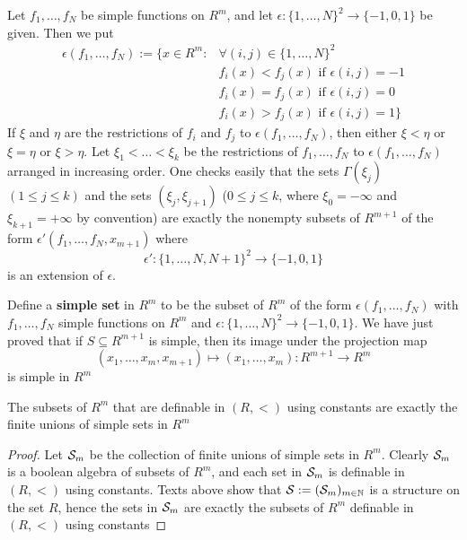 \documentclass[11pt]{article}
\begin{document}
Let \(f_1,\dots,f_N\) be simple functions on \(R^m\), and let \(\epsilon:\{1,\dots,N\}^2\to\{-1,0,1\}\) be given. Then
we put
\begin{align*}
\epsilon(f_1,\dots,f_N):=\{x\in R^m:&\forall(i,j)\in\{1,\dots,N\}^2\\
&f_i(x)<f_j(x)\text{ if }\epsilon(i,j)=-1\\
&f_i(x)=f_j(x)\text{ if }\epsilon(i,j)=0\\
&f_i(x)>f_j(x)\text{ if }\epsilon(i,j)=1\}
\end{align*}
If \(\xi\) and \(\eta\) are the restrictions of \(f_i\) and \(f_j\) to \(\epsilon(f_1,\dots,f_N)\), then either \(\xi<\eta\)
or \(\xi=\eta\) or \(\xi>\eta\). Let \(\xi_1<\dots<\xi_k\) be the restrictions of \(f_1,\dots,f_N\) to \(\epsilon(f_1,\dots,f_N)\)
arranged in increasing order. One checks easily that the sets \(\Gamma(\xi_j)\) \((1\le j\le k)\) and the
sets \((\xi_j,\xi_{j+1})\) (\(0\le j\le k\), where \(\xi_0=-\infty\) and \(\xi_{k+1}=+\infty\) by convention) are
exactly the nonempty subsets of \(R^{m+1}\) of the form \(\epsilon'(f_1,\dots,f_N,x_{m+1})\) where
\begin{equation*}
\epsilon':\{1,\dots,N,N+1\}^2\to\{-1,0,1\}
\end{equation*}
is an extension of \(\epsilon\).

Define a \textbf{simple set} in \(R^m\) to be the subset of \(R^m\) of the
form \(\epsilon(f_1,\dots,f_N)\) with \(f_1,\dots,f_N\) simple functions on \(R^m\) and \(\epsilon:\{1,\dots,N\}^2\to\{-1,0,1\}\).
We have just proved that if \(S\subseteq R^{m+1}\) is simple, then its image under the projection map
    \begin{equation*}
(x_1,\dots,x_m,x_{m+1})\mapsto(x_1,\dots,x_m):R^{m+1}\to R^m
    \end{equation*}
is simple in \(R^m\)

\begin{proposition}[]
The subsets of \(R^m\) that are definable in \((R,<)\) using constants are exactly the finite
unions of simple sets in \(R^m\)
\end{proposition}

\begin{proof}
Let \(\mathcal{S}_m\) be the collection of finite unions of simple sets in \(R^m\). Clearly \(\mathcal{S}_m\) is a
boolean algebra of subsets of \(R^m\), and each set in \(\mathcal{S}_m\) is definable in \((R,<)\) using
constants. Texts above show that \(\mathcal{S}:=(\mathcal{S}_m)_{m\in\mathbb{N}}\) is a structure on the set \(R\), hence the
sets in \(\mathcal{S}_m\) are exactly the subsets of \(R^m\) definable in \((R,<)\) using constants
\end{proof}
\end{document}
